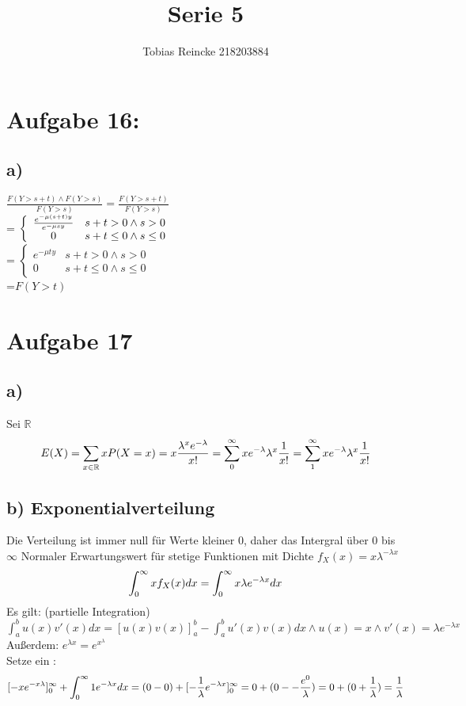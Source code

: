 \documentclass[11pt]{article} %
\title{\color{blue} Serie 5 }
\author{Tobias Reincke 218203884 \\}
\begin{document}
	
\maketitle
\section*{\textbf Aufgabe 16:}

\subsection*{a)}
$\frac{ F(Y >s+t) \land F(Y>s)}{F(Y>s)} = \frac{F(Y>s+t)}{F(Y>s)}$\\
= $\left\{\\
\begin{array}{cc}
  \frac{e^{-\mu (s+t)y}}{e^{-\mu s y}}   & s+t > 0 \land s  > 0 \\
  0 & s+t \leq 0 \land s \leq 0 
\end{array}\right. $\\
= $\left\{
 \begin{array}{cc}
  e^{-\mu t y}   & s+t > 0 \land s  >0 \\
  0 & s+t \leq 0 \land s \leq 0
\end{array} \right. $
\\=$F(Y>t)$
\section*{\textbf Aufgabe 17}
\subsection*{a)}
Sei $\mathbb{R}$   
$$ E(X) =
\sum_{x \in \mathbb{R} } x P(X = x) \\
= x \frac{ \lambda^x e^{-\lambda}}{x!}
= \sum_{0}^{\infty} x e^{-\lambda} \lambda^x \frac{1}{x!}
= \sum_{1}^{\infty} x e^{-\lambda} \lambda^x \frac{1}{x!}

$$
\subsection*{b) Exponentialverteilung}
Die Verteilung ist immer null für Werte kleiner 0, daher das Intergral über 0 bis $\infty$
Normaler Erwartungswert für stetige Funktionen mit Dichte $f_X(x) =x \lambda ^{-\lambda x}  $
$$ 
\int_{0}^{\infty}  x f_X(x) dx \\
= \int_{0}^{\infty} x \lambda  e^{-\lambda x} dx \\
$$
Es gilt: (partielle Integration)\\
$\int_a^b u(x)v'(x) dx = [ u(x) v(x) ]_a^b - \int_a^b u' (x) v(x) dx  \land u(x) = x \land v'(x) = \lambda e^{-\lambda x} $\\
Außerdem: $e^{\lambda x} = e ^ {x ^ \lambda} $\\
Setze ein :
$$
[-x  e^{-x \lambda} ]_0^\infty + \int_{0}^{\infty} 1 e^{-\lambda x} dx \\
=(0 - 0) + [ - \frac{1}{\lambda} e^{-\lambda x} ]_0^\infty \\
= 0 + ( 0 -  -\frac{e^0}{\lambda}  )
= 0 + ( 0 + \frac{1}{\lambda}) \\
= \frac{1}{\lambda}
$$
\end{document}
